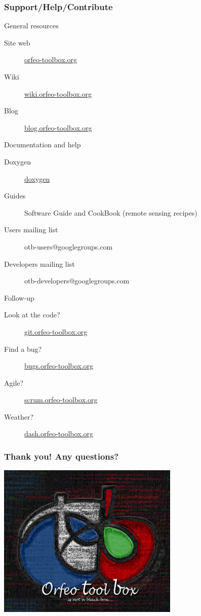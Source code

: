 \documentclass[8pt]{beamer}
\begin{document}
\begin{frame}
\frametitle{Support/Help/Contribute}
\vspace{-0.2cm}
\begin{block}{General resources}
\vspace{-0.2cm}
\begin{description}
\item[Site web] \href{http://www.orfeo-toolbox.org}{orfeo-toolbox.org}
\item[Wiki] \href{http://wiki.orfeo-toolbox.org}{wiki.orfeo-toolbox.org}
\item[Blog] \href{http://blog.orfeo-toolbox.org}{blog.orfeo-toolbox.org}
\end{description}
\end{block}
\vspace{-0.2cm}
\begin{block}{Documentation and help}
\vspace{-0.2cm}
\begin{description}
\item[Doxygen] \href{http://www.orfeo-toolbox.org/doxygen/}{doxygen}
\item[Guides] Software Guide and CookBook (remote sensing recipes)
\item[Users mailing list] otb-users@googlegroups.com
\item[Developers mailing list] otb-developers@googlegroups.com
\end{description}
\end{block}
\vspace{-0.2cm}
\begin{block}{Follow-up}
\vspace{-0.2cm}
\begin{description}
\item[Look at the code?] \href{http://git.orfeo-toolbox.org}{git.orfeo-toolbox.org}
\item[Find a bug?] \href{http://bugs.orfeo-toolbox.org}{bugs.orfeo-toolbox.org}
\item[Agile?] \href{http://scrum.orfeo-toolbox.org}{scrum.orfeo-toolbox.org}
\item[Weather?] \href{http://dash.orfeo-toolbox.org}{dash.orfeo-toolbox.org}
\end{description}
\end{block}
\end{frame}


\begin{frame}
\frametitle{Thank you! Any questions?}
\begin{minipage}[t][6cm][t]{\textwidth}
\begin{center}
\includegraphics[width=0.65\textwidth]{images/LOGOTB_blackbox.png}
\end{center}
\end{minipage}
\end{frame}
\end{document}
